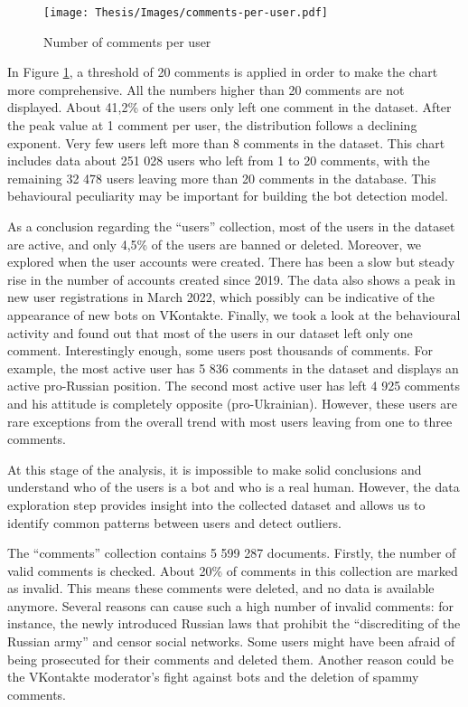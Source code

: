\begin{figure}
	\centering
	\texttt{[image: Thesis/Images/comments-per-user.pdf]}
	\caption{Number of comments per user}
	\label{fig:comments-per-user}
\end{figure}

In Figure  \ref{fig:comments-per-user}, a threshold of 20 comments is applied in order to make the chart more comprehensive. All the numbers higher than 20 comments are not displayed. About 41,2\% of the users only left one comment in the dataset. After the peak value at 1 comment per user, the distribution follows a declining exponent. Very few users left more than 8 comments in the dataset. This chart includes data about 251 028 users who left from 1 to 20 comments, with the remaining 32 478 users leaving more than 20 comments in the database. This behavioural peculiarity may be important for building the bot detection model.

As a conclusion regarding the ``users'' collection, most of the users in the dataset are active, and only 4,5\% of the users are banned or deleted. Moreover, we explored when the user accounts were created. There has been a slow but steady rise in the number of accounts created since 2019. The data also shows a peak in new user registrations in March 2022, which possibly can be indicative of the appearance of new bots on VKontakte. Finally, we took a look at the behavioural activity and found out that most of the users in our dataset left only one comment. Interestingly enough, some users post thousands of comments. For example, the most active user has 5 836 comments in the dataset and displays an active pro-Russian position. The second most active user has left 4 925 comments and his attitude is completely opposite (pro-Ukrainian). However, these users are rare exceptions from the overall trend with most users leaving from one to three comments.

At this stage of the analysis, it is impossible to make solid conclusions and understand who of the users is a bot and who is a real human. However, the data exploration step provides insight into the collected dataset and allows us to identify common patterns between users and detect outliers.

The ``comments'' collection contains 5 599 287 documents. Firstly, the number of valid comments is checked. About 20\% of comments in this collection are marked as invalid. This means these comments were deleted, and no data is available anymore. Several reasons can cause such a high number of invalid comments: for instance, the newly introduced Russian laws that prohibit the ``discrediting of the Russian army'' and censor social networks. Some users might have been afraid of being prosecuted for their comments and deleted them. Another reason could be the VKontakte moderator’s fight against bots and the deletion of spammy comments.

